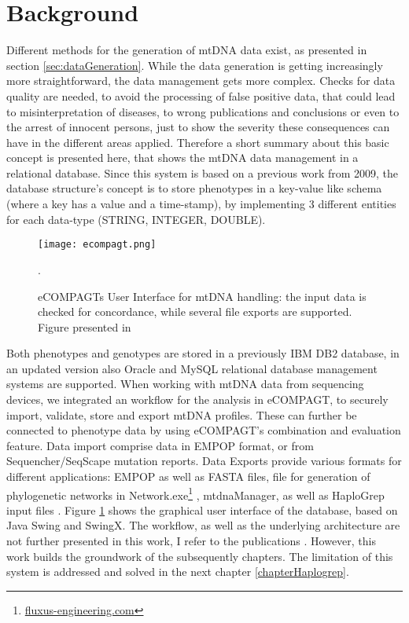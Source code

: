 \section{Background}
Different methods for the generation of mtDNA data exist, as presented in section \ref{sec:dataGeneration}. While the data generation is getting increasingly more straightforward, the data management gets more complex. Checks for data quality are needed, to avoid the processing of false positive data, that could lead to misinterpretation of diseases, to wrong publications and conclusions or even to the arrest of innocent persons, just to show the severity these consequences can have in the different areas applied.
Therefore a short summary about this basic concept is presented here, that shows the mtDNA data management in a relational database. Since this system is based on a previous work\cite{Schoenherr2009} from 2009, the database structure's concept is to store phenotypes in a key-value like schema (where a key has a value and a time-stamp), by implementing 3 different entities for each data-type (STRING, INTEGER, DOUBLE).
\begin{figure}[ht]
\begin{center}
\texttt{[image: ecompagt.png]}
\caption[eCOMPAGTs User Interface]{eCOMPAGTs User Interface for mtDNA handling: the input data is checked for concordance, while several file exports are supported. Figure presented in \cite{Weissensteiner2010}}.
\label{fig:ecompagt}
\end{center}
\end{figure}
Both phenotypes and genotypes are stored in a previously IBM DB2 database, in an updated version also Oracle and MySQL relational database management systems are supported. When working with mtDNA data from sequencing devices, we integrated an workflow for the analysis in eCOMPAGT, to securely import, validate, store and export mtDNA profiles.  These can further be connected to phenotype data by using eCOMPAGT's combination and evaluation feature. Data import comprise data in EMPOP format\cite{Parson2007}, or from Sequencher/SeqScape mutation reports. Data Exports provide various formats for different applications: EMPOP as well as FASTA files, file for generation of phylogenetic networks in Network.exe\footnote{\url{fluxus-engineering.com}} \cite{Bandelt1999}, mtdnaManager\cite{Lee2008}, as well as HaploGrep input files \cite{Kloss-Brandstatter2011,Weissensteiner2016a}. Figure \ref{fig:ecompagt} shows the graphical user interface of the database, based on Java Swing and SwingX. The workflow, as well as the underlying architecture are not further presented in this work, I refer to the publications \cite{Schoenherr2009,Weissensteiner2010}. However, this work builds the groundwork of the subsequently chapters. The limitation of this system is addressed and solved in the next chapter \ref{chapterHaplogrep}.


